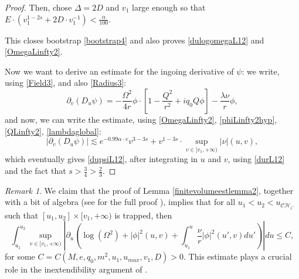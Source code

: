 \documentclass[10pt,a4paper]{article}
\theoremstyle{plain}
\theoremstyle{remark}
\newtheorem{rmk}{Remark}[section]
\theoremstyle{definition}
\theoremstyle{plain}
\theoremstyle{remark}
\theoremstyle{definition}
\newcommand{\uu}{u_{max}}
\newcommand{\CH}{\mathcal{CH}_{i^+}}
\numberwithin{equation}{section}
\begin{document}
\begin{proof}
	Then, chose $\Delta=2D$ and $v_1$ large enough so that $E \cdot ( v_1^{1-2s} + 2D \cdot v_1^{-1}) < \frac{\alpha}{100}$. 
	
	This closes bootstrap \eqref{bootstrap4} and also proves  \eqref{dulogomegaL12} and \eqref{OmegaLinfty2}.
	
	Now we want to derive an estimate for the ingoing derivative of $\psi$: we write, using \eqref{Field3}, and also \eqref{Radius3}: \begin{equation} \label{Field4}
	\partial_v( D_u \psi )= -\frac{\Omega^2}{4r} \phi \cdot \left[1-\frac{Q^2}{r^2} +iq_0 Q \phi\right] -\frac{\lambda \nu}{r} \phi,
	\end{equation} and now, we can write the estimate, using \eqref{OmegaLinfty2}, \eqref{phiLinfty2hyp}, \eqref{QLinfty2}, \eqref{lambdaglobal}: $$ |\partial_v( D_u \psi )| \lesssim e^{-0.99 \alpha \cdot v} v^{3-3s}+ v^{1-3s} \cdot \sup_{ v \in [v_1,+\infty)}|\nu|(u,v),$$ which eventually gives \eqref{dupsiL12}, after integrating in $u$ and $v$, using \eqref{durL12} and the fact that $s>\frac{3}{4}>\frac{2}{3}$.
	
\end{proof}

\begin{rmk}
	We claim that the proof of Lemma \ref{finitevolumeestlemma2}, together with a bit of algebra (see \cite{Moi3Christoph} for the full proof ), implies that for all $u_1<u_2<u_{\CH}$ such that $[u_1,u_2]\times [v_1,+\infty)$ is trapped, then \begin{equation} \label{MoiChristoph2}
	\int_{u_1}^{u_{2}} \sup_{v\in[v_1,+\infty)}  |\partial_u \left(\log(\Omega^2)+ |\phi|^2(u,v) +\int_{u_1}^{u}\frac{\nu}{r} |\phi|^2(u',v) du' \right)|du \leq C,
	\end{equation} for some $C=C(M,e,q_0,m^2,u_1,\uu,v_1,D)>0$. This estimate plays a crucial role in the inextendibility argument of \cite{Moi3Christoph}.
\end{rmk}
\end{document}
